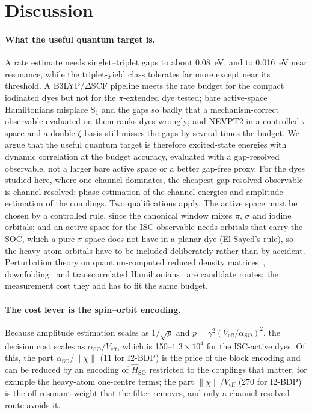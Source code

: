 \documentclass[journal=jctcce,manuscript=article,layout=twocolumn]{achemso}
\newcommand{\Hso}{\hat H_\mathrm{SO}}
\newcommand{\aso}{\alpha_\mathrm{SO}}
\begin{document}
\section{Discussion}

\paragraph{What the useful quantum target is.} A rate estimate needs singlet--triplet gaps to about
0.08~eV, and to 0.016~eV near resonance, while the triplet-yield class tolerates far more except near its
threshold. A B3LYP/$\Delta$SCF pipeline meets the rate budget for the compact iodinated dyes but not for the
$\pi$-extended dye tested; bare active-space Hamiltonians misplace S$_1$ and the gaps so badly that a
mechanism-correct observable evaluated on them ranks dyes wrongly; and NEVPT2 in a controlled $\pi$ space and
a double-$\zeta$ basis still misses the gaps by several times the budget. We argue that the useful quantum
target is therefore excited-state energies with dynamic correlation at the budget accuracy, evaluated with a
gap-resolved observable, not a larger bare active space or a better gap-free proxy. For the dyes studied here,
where one channel dominates, the cheapest gap-resolved observable is channel-resolved: phase estimation of
the channel energies and amplitude estimation of the couplings. Two qualifications apply. The
active space must be chosen by a controlled rule, since the canonical window mixes $\pi$, $\sigma$ and
iodine orbitals; and an active space for the ISC observable needs orbitals that carry the SOC, which a pure
$\pi$ space does not have in a planar dye (El-Sayed's rule), so the heavy-atom orbitals have to be
included deliberately rather than by accident. Perturbation theory on quantum-computed reduced density
matrices~\cite{Krompiec2022,Takeshita2020}, downfolding~\cite{Huang2023DSRG} and transcorrelated
Hamiltonians~\cite{Motta2020TC,Kumar2022TC} are candidate routes; the measurement cost they add has to fit
the same budget. 

\paragraph{The cost lever is the spin--orbit encoding.} Because amplitude estimation scales as
$1/\sqrt p$ and $p=\gamma^2(V_\mathrm{eff}/\aso)^2$, the decision cost scales as $\aso/V_\mathrm{eff}$, which is
150--$1.3\times10^{4}$ for the ISC-active dyes. Of this, the part $\aso/\lVert\chi\rVert$ (11 for I2-BDP) is
the price of the block encoding and can be reduced by an encoding of $\Hso$ restricted to the couplings that
matter, for example the heavy-atom one-centre terms; the part $\lVert\chi\rVert/V_\mathrm{eff}$ (270 for
I2-BDP) is the off-resonant weight that the filter removes, and only a channel-resolved route avoids it.
\end{document}
